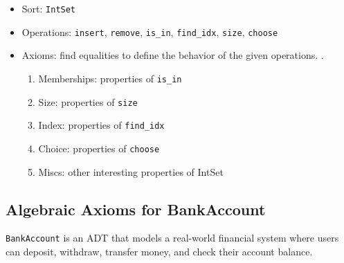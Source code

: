 \documentclass[oneside,11pt,dvipsnames]{book}
\newcommand{\code}[1]{\texttt{#1}}
\begin{document}
\begin{itemize}
    \item Sort: \code{IntSet}
    \item Operations: \code{insert}, \code{remove}, \code{is\_in}, \code{find\_idx}, \code{size}, \code{choose}
    \item Axioms: find equalities to define the behavior of the given operations. .
    \begin{enumerate}
        \item  Memberships: properties of \code{is\_in}
        \item Size: properties of \code{size}
        \item Index: properties of \code{find\_idx}
        \item Choice: properties of \code{choose}
        \item Miscs: other interesting properties of IntSet
    \end{enumerate}
\end{itemize}


\subsection{Algebraic Axioms for BankAccount}\label{exercise:algebraic-axioms-bank-account}

\code{BankAccount} is an ADT that models a real-world financial system where users can deposit, withdraw, transfer money, and check their account balance.
\end{document}
